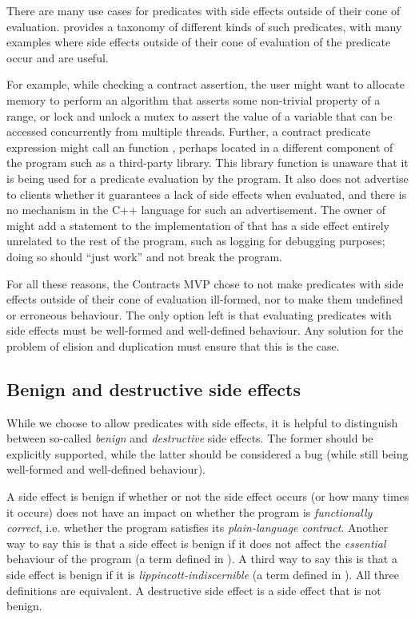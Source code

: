 There are many use cases for predicates with side effects outside of their cone of evaluation. \cite{P2712R0} provides a taxonomy of different kinds of such predicates, with many  
examples where side effects outside of their cone of evaluation of the predicate occur and are useful.

For example, while checking a contract assertion, the user might want to allocate memory to perform an algorithm that asserts some non-trivial property of a range, or lock and unlock a mutex to assert the value of a variable that can be accessed concurrently from multiple threads. Further, a contract predicate expression might call an function , perhaps located in a different component of the program such as a third-party library. This library function is unaware that it is being used for a predicate evaluation by the program. It also does not advertise to
clients whether it guarantees a lack of side effects when evaluated, and there is no mechanism  in the C++ language for such an advertisement. The owner of  might add a statement to the implementation of  that has a side effect entirely unrelated to the rest of the program, such as logging for debugging purposes; doing so should ``just work'' and not break the program. 

For all these reasons, the Contracts MVP chose to not make predicates with side effects outside of their cone of evaluation ill-formed, nor to make them undefined or erroneous behaviour. The only option left is that evaluating predicates with side effects must be well-formed and well-defined behaviour. Any solution for the problem of elision and duplication must ensure that this is the case.

\subsection{Benign and destructive side effects}
\label{subsec:benign}

While we choose to allow predicates with side effects, it is helpful to distinguish between so-called \emph{benign} and \emph{destructive} side effects. The former should be explicitly supported, while the latter should be considered a bug (while still being well-formed and well-defined behaviour).

A side effect is benign if whether or not the side effect occurs (or how many times it occurs) does not have an impact on whether the program is \emph{functionally correct}, i.e. whether the program satisfies its \emph{plain-language contract}. Another way to say this is that a side effect is benign if it does not affect the \emph{essential} behaviour of the program (a term defined in \cite{P2053R1}). A third way to say this is that a side effect is benign if it is \emph{lippincott-indiscernible} (a term defined in \cite{P2461R1}). All three definitions are equivalent. A destructive side effect is a side effect that is not benign. 

